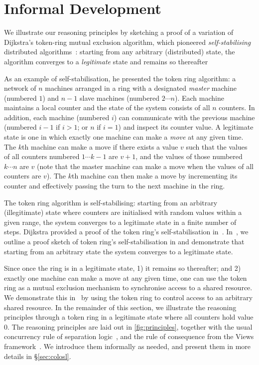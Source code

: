 \section{Informal Development}
\label{sec:intuition}

We illustrate our \colosl reasoning principles by sketching a proof of
a variation of Dijkstra's token-ring mutual exclusion algorithm, which
pioneered \emph{self-stabilising} distributed
algorithms~\cite{dijkstra74}: starting from any arbitrary
(distributed) state, the algorithm converges to a \emph{legitimate}
state and remains so thereafter
 
As an example of self-stabilisation, he presented the token ring
algorithm: a network of $n$ machines arranged in a ring with a
designated \emph{master} machine (numbered $1$) and $n-1$ slave
machines (numbered $2 \cdots n$). Each machine maintains a local
counter and the state of the system consists of all $n$ counters.
In addition, each machine (numbered $i$) can communicate with the
previous machine (numbered $i-1$ if $i>1$; or $n$ if $i=1$) and
inspect its counter value.
%
A legitimate state is one in which exactly one machine can make a
\emph{move} at any given time. The $k$th machine can make a move if
there exists a value $v$ such that the values of all counters numbered
$1\cdots k-1$ are $v+1$, and the values of those numbered $k\cdots n$
are $v$ (note that the master machine can make a move when the values
of all counters are $v$). The $k$th machine can then make a move by
incrementing its counter and effectively passing the turn to the next
machine in the ring.
 
The token ring algorithm is self-stabilising: starting from an
arbitrary (illegitimate) state where counters are initialised with
random values within a given range, the system converges to a
legitimate state in a finite number of steps. Dijkstra provided a
proof of the token ring's self-stabilisation
in~\cite{dijkstra-proof}. In~\cite{colosl-tr14}, we outline a proof
sketch of token ring's self-stabilisation in \colosl and demonstrate
that starting from an arbitrary state the system converges to a
legitimate state.
 
Since once the ring is in a legitimate state, 1) it remains so
thereafter; and 2) exactly one machine can make a move at any given
time, one can use the token ring as a mutual exclusion mechanism to
synchronise access to a shared resource. We demonstrate this
in~\cite{colosl-tr14} by using the token ring to control access to an
arbitrary shared resource.  In the remainder of this section, we
illustrate the \colosl reasoning principles through a token ring in a
legitimate state where all counters hold value $0$.  The \colosl
reasoning principles are laid out in \fig\ref{fig:principles},
together with the usual concurrency rule of separation
logic~\cite{csl-tcs}, and the rule of consequence from the Views
framework~\cite{views}.  We introduce them informally as needed, and
present them in more details in \S\ref{sec:colosl}.

